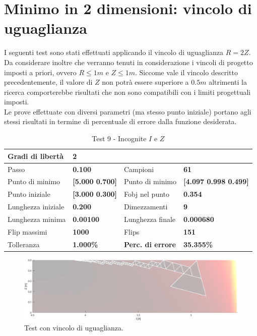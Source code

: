 \documentclass[a4paper, 11pt]{article}
\begin{document}
\newpage
\section{Minimo in 2 dimensioni: vincolo di uguaglianza}

I seguenti test sono stati effettuati applicando il vincolo di uguaglianza $R =
2Z$. Da considerare inoltre che verranno tenuti in considerazione i vincoli di
progetto imposti a priori, ovvero $R \le 1m$ e $Z \le 1m$. Siccome vale il
vincolo descritto precedentemente, il valore di $Z$ non potrà essere superiore a
$0.5m$ altrimenti la ricerca comporterebbe risultati che non sono compatibili
con i limiti progettuali imposti. \\
Le prove effettuate con diversi parametri (ma stesso punto iniziale) portano
agli stessi risultati in termine di percentuale di errore dalla funzione
desiderata.

\begin{table}[h]
    \caption{Test 9 - Incognite $I$ e $Z$}
    \begin{center}
    \begin{tabular}{|l|l|l|l|} 
    \hline 
Gradi di libertà & \textbf{2} &  &  \\ \hline 
Passo & \textbf{0.100} & Campioni & \textbf{61} \\ \hline 
Punto di minimo & \textbf{{[}5.000 0.700{]}} & Punto di minimo &
\textbf{{[}4.097 0.998 0.499{]}} \\ \hline 
Punto iniziale & \textbf{{[}3.000 0.300{]}} & Fobj nel punto & \textbf{0.354} \\
\hline 
Lunghezza iniziale & \textbf{0.200} & Dimezzamenti & \textbf{9} \\ \hline 
Lunghezza minima & \textbf{0.00100} & Lunghezza finale & \textbf{0.000680} \\
\hline
Flip massimi & \textbf{1000} & Flips & \textbf{151} \\ \hline 
Tolleranza & \textbf{1.000\%} & \textbf{Perc. di errore} & \textbf{35.355\%} \\
\hline 
    \end{tabular} 
    \end{center}
    \end{table}

\begin{figure}[H]
    \centering
        \includegraphics[width=15cm]{assets/figure11}
        \caption{Test con vincolo di uguaglianza.}
\end{figure}
\end{document}

